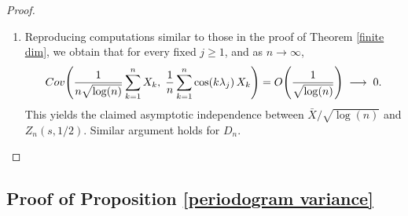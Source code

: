 \documentclass[10pt,a4paper]{amsart}
\numberwithin{equation}{section}
\newcommand{\Cov}{{\rm Cov}}
\begin{document}
\begin{proof}
\begin{enumerate}
Therefore,
\[
\mathrm{Var}(D_n)
\sim \frac{\delta(-1/2)}{4}\log(n)
+\frac{3\delta(-1/2)}{4}\log(n)
-2\cdot \frac{\delta(-1/2)}{4}\log(n)
=\frac{\delta(-1/2)}{2}\log(n).
\].
\item Reproducing computations similar to those in the proof of Theorem \ref{finite dim}, we obtain that for every fixed  $j\ge1$, and as $n\to\infty$,
\[
\Cov\!\left(
\frac{1}{n\sqrt{\log(n)}}\sum_{k=1}^n X_k,\;
\frac{1}{n}\sum_{k=1}^n \cos(k\lambda_j)\,X_k
\right)
=
O\!\left(\frac{1}{\sqrt{\log(n)}}\right)
\;\longrightarrow\;0.
\]
This yields the claimed asymptotic independence between $\bar X/\sqrt{\log(n)}$ and $Z_n(s,1/2)$. Similar argument holds for $D_n.$
\end{enumerate}
\end{proof}
\subsection{Proof of Proposition \ref{periodogram variance}}
\end{document}
